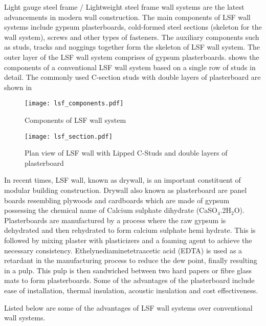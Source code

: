 Light gauge steel frame / Lightweight steel frame wall systems are the latest advancements in modern wall construction. The main components of LSF wall systems include gypsum plasterboards, cold-formed steel sections (skeleton for the wall system), screws and other types of fasteners. The auxiliary components such as studs, tracks and noggings together form the skeleton of LSF wall system. The outer layer of the LSF wall system comprises of gypsum plasterboards.  shows the components of a conventional LSF wall system based on a single row of studs in detail. The commonly used C-section studs with double layers of plasterboard are shown in 
\begin{figure}[htbp]
	\centering	
			\texttt{[image: lsf\_components.pdf]}
				\caption{Components of LSF wall system}
		\label{fig:lsf_components}
\end{figure}
\begin{figure}[htbp]
	\centering	
		\texttt{[image: lsf\_section.pdf]}
		\caption{Plan view of LSF wall with Lipped C-Studs and double layers of plasterboard}
		\label{fig:lsf_section}
\end{figure}

In recent times, LSF wall, known as drywall, is an important constituent of modular building construction. Drywall also known as plasterboard are panel boards resembling plywoods and cardboards which are made of gypsum possessing the chemical name of Calcium sulphate dihydrate (CaSO$_4$.2H$_2$O). Plasterboards are manufactured by a process where the raw gypsum is dehydrated and then rehydrated to form calcium sulphate hemi hydrate. This is followed by mixing plaster with plasticizers and a foaming agent to achieve the necessary consistency. Ethelynediaminetetraacetic acid (EDTA) is used as a retardant in the manufacturing process to reduce the dew point, finally resulting in a pulp. This pulp is then sandwiched between two hard papers or fibre glass mats to form plasterboards. Some of the advantages of the plasterboard include ease of installation, thermal insulation, acoustic insulation and cost effectiveness.

Listed below are some of the advantages of LSF wall systems over conventional wall systems.

